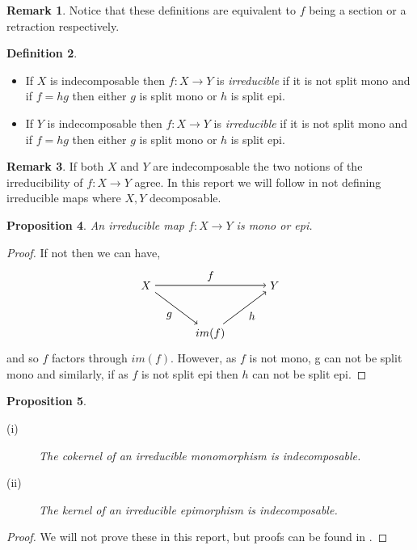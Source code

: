 \documentclass[11.5pt, twoside, a4paper, titlepage]{report}
\theoremstyle{definition}
\newtheorem{mydef}{Definition}[section]
\newtheorem{rem}[mydef]{Remark}
\theoremstyle{plain}
\newtheorem{prop}[mydef]{Proposition}
\begin{document}
\begin{rem}
Notice that these definitions are equivalent to $f$ being a section or a retraction respectively.
\end{rem}

\begin{mydef}
\begin{itemize}
\item If $X$ is indecomposable then $f:X \to Y$ is \emph{irreducible} if it is not split mono and if $f=hg$ then either $g$ is split mono or $h$ is split epi.
\item If $Y$ is indecomposable then $f: X \to Y$ is \emph{irreducible} if it is not split mono and if $f=hg$ then either $g$ is split mono or $h$ is split epi.
\end{itemize}
\end{mydef}

\begin{rem}
If both $X$ and $Y$ are indecomposable the two notions of the irreducibility of $f:X \to Y$ agree. In this report we will follow \cite{CB3} in not defining irreducible maps where $X,Y$ decomposable.
\end{rem}

\begin{prop}
An irreducible map $f: X \to Y$ is mono or epi.
\end{prop}
\begin{proof}
If not then we can have,
\begin{equation*}
\begin{tikzpicture}[->,-latex, auto, main path/.style={->, semithick}, main node/.style={}]
\node	[main node]		(1) at (0,0)		{$X$};
\node [main node]		(2) at (4,0)		{$Y$};
\node [main node]		(3) at (2,-1.5)	{$im(f)$};

\draw (1) [main path] edge node [auto] {$f$} (2);
\draw (1) [main path] edge node [auto, swap] {$g$} (3);
\draw (3) [main path] edge node [auto, swap] {$h$} (2);
\end{tikzpicture}
\end{equation*}
and so $f$ factors through $im(f)$. However, as $f$ is not mono, g can not be split mono and similarly, if as $f$ is not split epi then $h$ can not be split epi.
\end{proof}

\begin{prop}
\begin{description}
\item [(i)] The cokernel of an irreducible monomorphism is indecomposable.
\item [(ii)] The kernel of an irreducible epimorphism is indecomposable.
\end{description}
\end{prop}
\begin{proof}
We will not prove these in this report, but proofs can be found in \cite{Assem}.
\end{proof}
\end{document}
